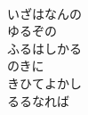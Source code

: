 \documentclass[10pt,b5j]{tarticle} %
\begin{document}
\begin{enumerate}
\begin{minipage}[c]{\blocksize}
    \end{minipage}
    \begin{minipage}[c]{\blocksize}
        
        \vspace{\linespace}
        \item~\\
        いざはなんの\\
        ゆるぞの\\
        ふるはしかる\\
        のきに\\
        きひてよかし\\
        るるなれば
    
    \end{minipage}
\end{enumerate} %
\end{document}
